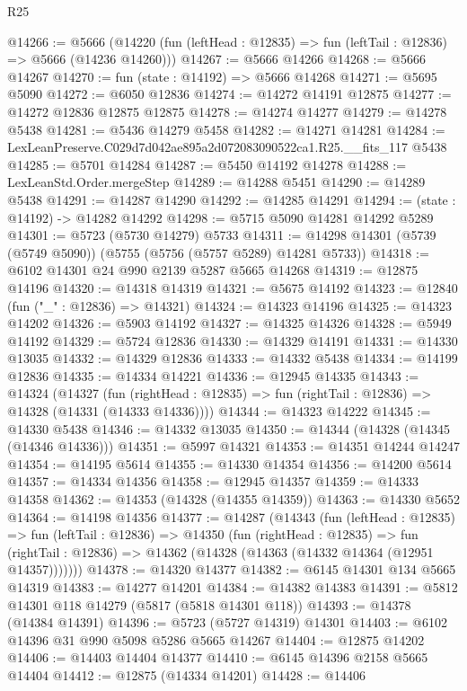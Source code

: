 \begin{lexlean}{R25}
\begin{coremodule}
@14266 := @5666
    (@14220 (fun (leftHead : @12835) => fun (leftTail : @12836) => @5666 (@14236 @14260)))
@14267 := @5666 @14266
@14268 := @5666 @14267
@14270 := fun (state : @14192) => @5666 @14268
@14271 := @5695 @5090
@14272 := @6050 @12836
@14274 := @14272 @14191 @12875
@14277 := @14272 @12836 @12875 @12875
@14278 := @14274 @14277
@14279 := @14278 @5438
@14281 := @5436 @14279 @5458
@14282 := @14271 @14281
@14284 := LexLeanPreserve.C029d7d042ae895a2d072083090522ca1.R25.__fits_117 @5438
@14285 := @5701 @14284
@14287 := @5450 @14192 @14278
@14288 := LexLeanStd.Order.mergeStep
@14289 := @14288 @5451
@14290 := @14289 @5438
@14291 := @14287 @14290
@14292 := @14285 @14291
@14294 := (state : @14192) -> @14282 @14292
@14298 := @5715 @5090 @14281 @14292 @5289
@14301 := @5723 (@5730 @14279) @5733
@14311 := @14298 @14301 (@5739 (@5749 @5090)) (@5755 (@5756 (@5757 @5289) @14281 @5733))
@14318 := @6102 @14301 @24 @990 @2139 @5287 @5665 @14268
@14319 := @12875 @14196
@14320 := @14318 @14319
@14321 := @5675 @14192
@14323 := @12840 (fun ("_" : @12836) => @14321)
@14324 := @14323 @14196
@14325 := @14323 @14202
@14326 := @5903 @14192
@14327 := @14325 @14326
@14328 := @5949 @14192
@14329 := @5724 @12836
@14330 := @14329 @14191
@14331 := @14330 @13035
@14332 := @14329 @12836
@14333 := @14332 @5438
@14334 := @14199 @12836
@14335 := @14334 @14221
@14336 := @12945 @14335
@14343 := @14324
    (@14327
      (fun (rightHead : @12835) => fun (rightTail : @12836) => @14328 (@14331 (@14333 @14336))))
@14344 := @14323 @14222
@14345 := @14330 @5438
@14346 := @14332 @13035
@14350 := @14344 (@14328 (@14345 (@14346 @14336)))
@14351 := @5997 @14321
@14353 := @14351 @14244 @14247
@14354 := @14195 @5614
@14355 := @14330 @14354
@14356 := @14200 @5614
@14357 := @14334 @14356
@14358 := @12945 @14357
@14359 := @14333 @14358
@14362 := @14353 (@14328 (@14355 @14359))
@14363 := @14330 @5652
@14364 := @14198 @14356
@14377 := @14287
    (@14343
      (fun (leftHead : @12835) =>
      fun (leftTail : @12836) =>
      @14350
        (fun (rightHead : @12835) =>
        fun (rightTail : @12836) => @14362 (@14328 (@14363 (@14332 @14364 (@12951 @14357)))))))
@14378 := @14320 @14377
@14382 := @6145 @14301 @134 @5665 @14319
@14383 := @14277 @14201
@14384 := @14382 @14383
@14391 := @5812 @14301 @118 @14279 (@5817 (@5818 @14301 @118))
@14393 := @14378 (@14384 @14391)
@14396 := @5723 (@5727 @14319) @14301
@14403 := @6102 @14396 @31 @990 @5098 @5286 @5665 @14267
@14404 := @12875 @14202
@14406 := @14403 @14404 @14377
@14410 := @6145 @14396 @2158 @5665 @14404
@14412 := @12875 (@14334 @14201)
@14428 := @14406

\end{coremodule}
\end{lexlean}

